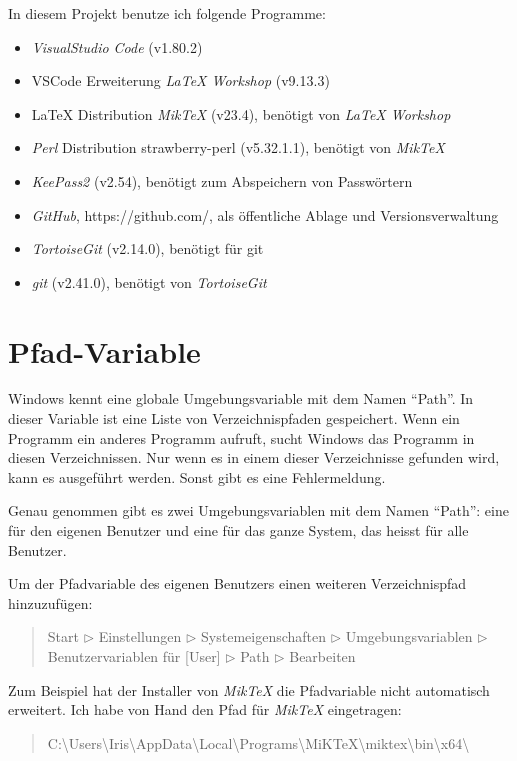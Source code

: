 \documentclass[a4paper]{article} %
\begin{document}
    In diesem Projekt benutze ich folgende Programme:
    \begin{itemize}
        \item \textsl{VisualStudio Code} (v1.80.2)
        \item VSCode Erweiterung \textsl{LaTeX Workshop} (v9.13.3)
        \item LaTeX Distribution \textsl{MikTeX} (v23.4), benötigt von \textsl{LaTeX Workshop}
        \item \textsl{Perl} Distribution strawberry-perl (v5.32.1.1), benötigt von \textsl{MikTeX}
        \item \textsl{KeePass2} (v2.54), benötigt zum Abspeichern von Passwörtern
        \item \textsl{GitHub}, https://github.com/, als öffentliche Ablage und Versionsverwaltung
        \item \textsl{TortoiseGit} (v2.14.0), benötigt für git
        \item \textsl{git} (v2.41.0), benötigt von \textsl{TortoiseGit}
    \end{itemize}

    \section{Pfad-Variable} %
    Windows kennt eine globale Umgebungsvariable mit dem Namen ``Path''.
    In dieser Variable ist eine Liste von Verzeichnispfaden gespeichert.
    Wenn ein Programm ein anderes Programm aufruft, 
    sucht Windows das Programm in diesen Verzeichnissen.
    Nur wenn es in einem dieser Verzeichnisse gefunden wird,
    kann es ausgeführt werden.
    Sonst gibt es eine Fehlermeldung.

    Genau genommen gibt es zwei Umgebungsvariablen mit dem Namen ``Path'':
    eine für den eigenen Benutzer und eine für das ganze System,
    das heisst für alle Benutzer.

    Um der Pfadvariable des eigenen Benutzers einen weiteren Verzeichnispfad hinzuzufügen:
    \begin{quote}
        Start $\triangleright$ Einstellungen $\triangleright$
        Systemeigenschaften $\triangleright$ Umgebungsvariablen
        $\triangleright$ Benutzervariablen für [User] $\triangleright$
        Path $\triangleright$ Bearbeiten
    \end{quote}

    Zum Beispiel hat der Installer von \textsl{MikTeX} die Pfadvariable
    nicht automatisch erweitert.
    Ich habe von Hand den Pfad für \textsl{MikTeX} eingetragen:
    \begin{quote}
        C:\textbackslash Users\textbackslash Iris\textbackslash AppData\textbackslash Local\textbackslash Programs\textbackslash MiKTeX\textbackslash miktex\textbackslash bin\textbackslash x64\textbackslash 
    \end{quote}
\end{document}
